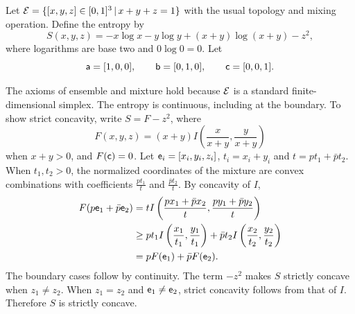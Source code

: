 \begin{example}\label{pm-es-nonorthogonalSimplex}
	Let $\Ens = \{[x,y,z] \in [0,1]^3 \, | \, x+y+z=1\}$ with the usual topology and mixing operation. Define the entropy by
	\begin{equation}
		S(x,y,z) = -x\log x-y\log y+(x+y)\log(x+y)-z^2,
	\end{equation}
	where logarithms are base two and $0\log0=0$. Let
	\begin{equation}
		\ens[a]=[1,0,0], \qquad
		\ens[b]=[0,1,0], \qquad
		\ens[c]=[0,0,1].
	\end{equation}
\end{example}

The axioms of ensemble and mixture hold because $\Ens$ is a standard finite-dimensional simplex. The entropy is continuous, including at the boundary. To show strict concavity, write $S=F-z^2$, where
\begin{equation}
	F(x,y,z) = (x+y)I\left(\frac{x}{x+y},\frac{y}{x+y}\right)
\end{equation}
when $x+y>0$, and $F(\ens[c])=0$. Let $\ens_i=[x_i,y_i,z_i]$, $t_i=x_i+y_i$ and $t=pt_1+\bar{p}t_2$. When $t_1,t_2>0$, the normalized coordinates of the mixture are convex combinations with coefficients $\frac{pt_1}{t}$ and $\frac{\bar{p}t_2}{t}$. By concavity of $I$,
\begin{equation}
	\begin{aligned}
		F(p\ens_1+\bar{p}\ens_2)
		&= tI\left(\frac{px_1+\bar{p}x_2}{t},
		\frac{py_1+\bar{p}y_2}{t}\right) \\
		&\geq pt_1I\left(\frac{x_1}{t_1},\frac{y_1}{t_1}\right)
		+\bar{p}t_2I\left(\frac{x_2}{t_2},\frac{y_2}{t_2}\right) \\
		&= pF(\ens_1)+\bar{p}F(\ens_2).
	\end{aligned}
\end{equation}
The boundary cases follow by continuity. The term $-z^2$ makes $S$ strictly concave when $z_1 \neq z_2$. When $z_1=z_2$ and $\ens_1 \neq \ens_2$, strict concavity follows from that of $I$. Therefore $S$ is strictly concave.

